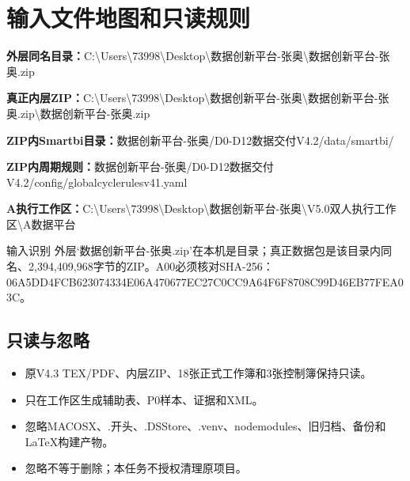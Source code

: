 \documentclass[UTF8,openany,zihao=-4]{ctexbook}
\renewcommand{\_}{\textunderscore\allowbreak}
\begin{document}
\chapter{输入文件地图和只读规则}
\noindent\textbf{外层同名目录：}{\promptlatin\promptcjk\small C:\textbackslash{}\allowbreak{}Users\textbackslash{}\allowbreak{}73998\textbackslash{}\allowbreak{}Desktop\textbackslash{}\allowbreak{}数据创新平台-\allowbreak{}张奥\textbackslash{}\allowbreak{}数据创新平台-\allowbreak{}张奥.zip}\par
\noindent\textbf{真正内层ZIP：}{\promptlatin\promptcjk\small C:\textbackslash{}\allowbreak{}Users\textbackslash{}\allowbreak{}73998\textbackslash{}\allowbreak{}Desktop\textbackslash{}\allowbreak{}数据创新平台-\allowbreak{}张奥\textbackslash{}\allowbreak{}数据创新平台-\allowbreak{}张奥.zip\textbackslash{}\allowbreak{}数据创新平台-\allowbreak{}张奥.zip}\par
\noindent\textbf{ZIP内Smartbi目录：}{\promptlatin\promptcjk\small 数据创新平台-\allowbreak{}张奥/\allowbreak{}D0-\allowbreak{}D12\_\allowbreak{}数据交付\_\allowbreak{}V4.2/\allowbreak{}data/\allowbreak{}smartbi/\allowbreak{}}\par
\noindent\textbf{ZIP内周期规则：}{\promptlatin\promptcjk\small 数据创新平台-\allowbreak{}张奥/\allowbreak{}D0-\allowbreak{}D12\_\allowbreak{}数据交付\_\allowbreak{}V4.2/\allowbreak{}config/\allowbreak{}global\_\allowbreak{}cycle\_\allowbreak{}rules\_\allowbreak{}v41.yaml}\par
\noindent\textbf{A执行工作区：}{\promptlatin\promptcjk\small C:\textbackslash{}\allowbreak{}Users\textbackslash{}\allowbreak{}73998\textbackslash{}\allowbreak{}Desktop\textbackslash{}\allowbreak{}数据创新平台-\allowbreak{}张奥\textbackslash{}\allowbreak{}V5.0\_\allowbreak{}双人执行工作区\textbackslash{}\allowbreak{}A\_\allowbreak{}数据平台}\par
\begin{dangerbox}{输入识别}
外层‘数据创新平台-张奥.zip’在本机是目录；真正数据包是该目录内同名、2,394,409,968字节的ZIP。A00必须核对SHA-256：06A5DD4FCB623074334E06A470677EC27C0CC9A64F6F8708C99D46EB77FEA03C。

\end{dangerbox}
\section{只读与忽略}
\begin{itemize}
\item 原V4.3 TEX/PDF、内层ZIP、18张正式工作簿和3张控制簿保持只读。
\item 只在工作区生成辅助表、P0样本、证据和XML。
\item 忽略\_\_MACOSX、.\_开头、.DS\_Store、.venv、node\_modules、旧归档、备份和LaTeX构建产物。
\item 忽略不等于删除；本任务不授权清理原项目。
\end{itemize}
\end{document}
